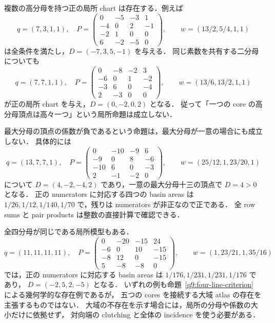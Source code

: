 複数の高分母を持つ正の局所 chart は存在する．例えば
\[
 q=(7,3,1,1),\quad
 P=\begin{pmatrix}
 0&-5&-3&1\\-4&0&2&-1\\-2&1&0&0\\6&-2&-5&0
 \end{pmatrix},\qquad
 w=(13/2,5/4,1,1)
\]
は全条件を満たし，$D=(-7,3,5,-1)$ を与える．
同じ素数を共有する二分母についても
\[
 q=(7,7,1,1),\quad
 P=\begin{pmatrix}
 0&-8&-2&3\\-6&0&1&-2\\-3&6&0&-4\\2&-3&0&0
 \end{pmatrix},\qquad
 w=(13/6,13/2,1,1)
\]
が正の局所 chart を与え，$D=(0,-2,0,2)$ となる．
従って「一つの core の高分母頂点は高々一つ」という局所命題は成立しない．

最大分母の頂点の係数が負であるという命題は，最大分母が一意の場合にも成立しない．
具体的には
\begin{equation}\label{kl10:unique-max-counterexample}
 q=(13,7,7,1),\quad
 P=\begin{pmatrix}
 0&-10&-9&6\\-9&0&8&-6\\-10&6&0&-3\\2&-1&-2&0
 \end{pmatrix},\qquad
 w=(25/12,1,23/20,1)
\end{equation}
について $D=(4,-2,-4,2)$ であり，一意の最大分母十三の頂点で $D=4>0$ となる．
正の numerators に対応する四つの basin areas は
$1/26,1/12,1/140,1/70$ で，残りは numerators が非正なので正である．
全 row sums と pair products は整数の直接計算で確認できる．

全四分母が同じである局所模型もある．
\begin{equation}\label{kl10:uniform-eleven}
 q=(11,11,11,11),\quad
 P=\begin{pmatrix}
 0&-20&-15&24\\-6&0&10&-15\\-8&12&0&-15\\5&-8&-8&0
 \end{pmatrix},\qquad
 w=(1,23/21,1,35/16)
\end{equation}
では，正の numerators に対応する basin areas は $1/176,1/231,1/231,1/176$ であり，
$D=(-2,5,2,-5)$ となる．
いずれの例も命題~\ref{q9:four-line-criterion} による幾何学的な存在例であるが，
五つの cores を接続する大域 atlas の存在を主張するものではない．
大域の不存在を示す場合には，局所の分母や係数の大小だけに依拠せず，
対向端の clutching と全体の incidence を使う必要がある．

